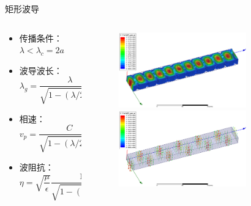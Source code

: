 \begin{frame}{矩形波导}
    \begin{columns}
        \begin{column}{0.5\linewidth}
            \begin{itemize}
                \item 传播条件：\\
                      $\lambda<\lambda_c=2a$
                \item 波导波长：\\
                      $\lambda_g=\dfrac{\lambda}{\sqrt{1-(\lambda/2a)^2}}$
                \item 相速：\\
                      $v_p=\dfrac{C}{\sqrt{1-(\lambda/2a)^2}}$
                \item 波阻抗：\\
                      $\eta=\sqrt{\dfrac{\mu}{\epsilon}}\dfrac{1}{\sqrt{1-(\lambda/2a)^2}}$
            \end{itemize}
        \end{column}
        \begin{column}{0.5\linewidth}
            \begin{figure}
                \includegraphics[width=5.5cm]{Cha6//fig6-13.png}
                \includegraphics[width=5.5cm]{Cha6//fig6-14.png}
            \end{figure}
        \end{column}
    \end{columns}

\end{frame}

